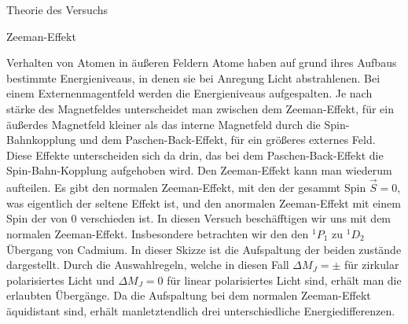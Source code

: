 \documentclass[pdftex, a4paper,11pt, twoside, ngerman]{report}
\begin{document}
  \begin{chapter}{Theorie des Versuchs}
    \label{chp:Theorie}
    
    
    
    \begin{section}{Zeeman-Effekt}
      
      \begin{subsection}{Verhalten von Atomen in äußeren Feldern}
        Atome haben auf grund ihres Aufbaus bestimmte Energieniveaus,
        in denen sie bei Anregung Licht abstrahlenen. 
        Bei einem Externenmagentfeld werden die Energieniveaus aufgespalten. 
        Je nach stärke des Magnetfeldes unterscheidet man zwischen dem
        Zeeman-Effekt, für ein äußerdes Magnetfeld kleiner als das interne
        Magnetfeld durch die Spin-Bahnkopplung und dem Paschen-Back-Effekt,
        für ein größeres externes Feld. Diese Effekte unterscheiden sich da
        drin, das bei dem Paschen-Back-Effekt die Spin-Bahn-Kopplung aufgehoben
        wird. Den Zeeman-Effekt kann man wiederum aufteilen. Es gibt den
        normalen Zeeman-Effekt, mit den der gesammt Spin $\vec S = 0$, was
        eigentlich der seltene Effekt ist, und den anormalen Zeeman-Effekt mit
        einem Spin der von 0 verschieden ist. In diesen Versuch beschäfftigen
        wir uns mit dem normalen Zeeman-Effekt. Insbesondere betrachten wir den
        den ${}^1P_1$ zu ${}^1D_2$ Übergang von Cadmium.
        In dieser Skizze ist die Aufspaltung der beiden zustände dargestellt.
        Durch die Auswahlregeln, welche in diesen Fall $\Delta M_J = \pm$ für
        zirkular polarisiertes Licht und $\Delta M_J=0$ für linear polarisiertes
        Licht sind, erhält man die erlaubten Übergänge. Da die Aufspaltung bei
        dem normalen Zeeman-Effekt äquidistant sind, erhält manletztendlich drei
        unterschiedliche Energiedifferenzen.
        
      \end{subsection}
      

\end{section}
\end{chapter}
\end{document}
